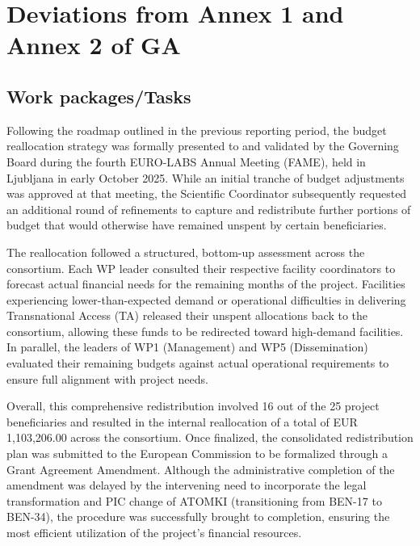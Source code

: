 
\section{Deviations from Annex 1 and Annex 2 of GA}
\label{sec:deviations}


\subsection{Work packages/Tasks}


Following the roadmap outlined in the previous reporting period, the budget reallocation strategy was formally presented to and validated by the Governing Board during the fourth EURO-LABS Annual Meeting (FAME), held in Ljubljana in early October 2025. While an initial tranche of budget adjustments was approved at that meeting, the Scientific Coordinator subsequently requested an additional round of refinements to capture and redistribute further portions of budget that would otherwise have remained unspent by certain beneficiaries.
 
The reallocation followed a structured, bottom-up assessment across the consortium. Each WP leader consulted their respective facility coordinators to forecast actual financial needs for the remaining months of the project. Facilities experiencing lower-than-expected demand or operational difficulties in delivering Transnational Access (TA) released their unspent allocations back to the consortium, allowing these funds to be redirected toward high-demand facilities. In parallel, the leaders of WP1 (Management) and WP5 (Dissemination) evaluated their remaining budgets against actual operational requirements to ensure full alignment with project needs.
 
Overall, this comprehensive redistribution involved 16 out of the 25 project beneficiaries and resulted in the internal reallocation of a total of EUR 1,103,206.00 across the consortium. Once finalized, the consolidated redistribution plan was submitted to the European Commission to be formalized through a Grant Agreement Amendment. Although the administrative completion of the amendment was delayed by the intervening need to incorporate the legal transformation and PIC change of ATOMKI (transitioning from BEN-17 to BEN-34), the procedure was successfully brought to completion, ensuring the most efficient utilization of the project's financial resources.


